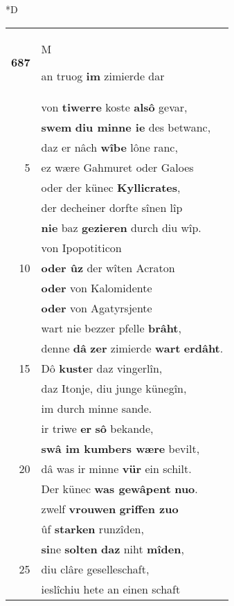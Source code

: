 \documentclass[8pt,a4paper,notitlepage]{article}
\begin{document}
\begin{table}[ht]
\begin{minipage}[t]{0.5\linewidth}
\small
\begin{center}*D
\end{center}
\begin{tabular}{rl}
\textbf{687} & \begin{large}M\end{large}an truog \textbf{im} zimierde dar\\ 
 & von \textbf{tiwerre} koste \textbf{alsô} gevar,\\ 
 & \textbf{swem} \textbf{diu minne ie} des betwanc,\\ 
 & daz er nâch \textbf{wîbe} lône ranc,\\ 
5 & ez wære Gahmuret oder Galoes\\ 
 & oder der künec \textbf{Kyllicrates},\\ 
 & der decheiner dorfte sînen lîp\\ 
 & \textbf{nie} baz \textbf{gezieren} durch diu wîp.\\ 
 & von Ipopotiticon\\ 
10 & \textbf{oder ûz} der wîten Acraton\\ 
 & \textbf{oder} von Kalomidente\\ 
 & \textbf{oder} von Agatyrsjente\\ 
 & wart nie bezzer pfelle \textbf{brâht},\\ 
 & denne \textbf{dâ} \textbf{zer} zimierde \textbf{wart} \textbf{erdâht}.\\ 
15 & Dô \textbf{kuste}r daz vingerlîn,\\ 
 & daz Itonje, diu junge künegîn,\\ 
 & im durch minne sande.\\ 
 & ir triwe \textbf{er} \textbf{sô} bekande,\\ 
 & \textbf{swâ im kumbers wære} bevilt,\\ 
20 & dâ was ir minne \textbf{vür} ein schilt.\\ 
 & Der künec \textbf{was gewâpent} \textbf{nuo}.\\ 
 & zwelf \textbf{vrouwen} \textbf{griffen zuo}\\ 
 & ûf \textbf{starken} runzîden,\\ 
 & \textbf{si}ne \textbf{solten} \textbf{daz} niht \textbf{mîden},\\ 
25 & diu clâre geselleschaft,\\ 
 & ieslîchiu hete an einen schaft\\ 

\end{tabular}
\end{minipage}
\end{table}
\end{document}
